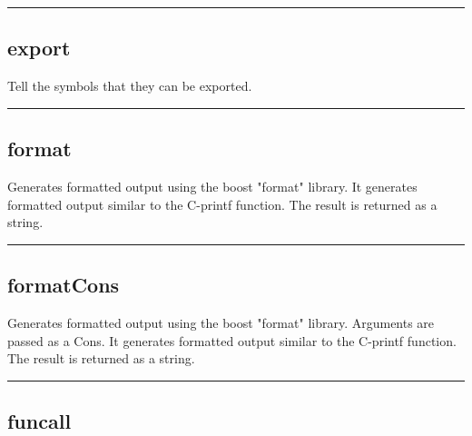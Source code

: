 \begin{itemize}
\rule{6in}{0.01cm}\par
{}\par
\subsection{export}

  Tell the symbols that they can be exported.


\rule{6in}{0.01cm}\par
{}\par
\subsection{format}
  \par

  Generates formatted output using the boost "format" library.  
  It generates formatted output similar to the C-printf function.
  The result is returned as a string.

\rule{6in}{0.01cm}\par
{}\par
\subsection{formatCons}
  \par

  Generates formatted output using the boost "format" library.  
  Arguments are passed as a Cons.
  It generates formatted output similar to the C-printf function.
  The result is returned as a string.

\rule{6in}{0.01cm}\par
{}\par
\subsection{funcall}


\end{itemize}

